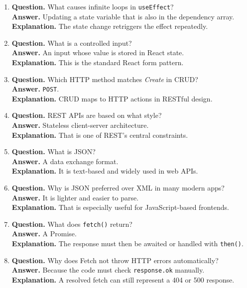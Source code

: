 \documentclass[11pt,a4paper]{article}
\begin{document}
\begin{enumerate}
  \item \textbf{Question.} What causes infinite loops in \texttt{useEffect}?\\
  \textbf{Answer.} Updating a state variable that is also in the dependency array.\\
  \textbf{Explanation.} The state change retriggers the effect repeatedly.

  \item \textbf{Question.} What is a controlled input?\\
  \textbf{Answer.} An input whose value is stored in React state.\\
  \textbf{Explanation.} This is the standard React form pattern.

  \item \textbf{Question.} Which HTTP method matches \emph{Create} in CRUD?\\
  \textbf{Answer.} \texttt{POST}.\\
  \textbf{Explanation.} CRUD maps to HTTP actions in RESTful design.

  \item \textbf{Question.} REST APIs are based on what style?\\
  \textbf{Answer.} Stateless client-server architecture.\\
  \textbf{Explanation.} That is one of REST's central constraints.

  \item \textbf{Question.} What is JSON?\\
  \textbf{Answer.} A data exchange format.\\
  \textbf{Explanation.} It is text-based and widely used in web APIs.

  \item \textbf{Question.} Why is JSON preferred over XML in many modern apps?\\
  \textbf{Answer.} It is lighter and easier to parse.\\
  \textbf{Explanation.} That is especially useful for JavaScript-based frontends.

  \item \textbf{Question.} What does \texttt{fetch()} return?\\
  \textbf{Answer.} A Promise.\\
  \textbf{Explanation.} The response must then be awaited or handled with \texttt{then()}.

  \item \textbf{Question.} Why does Fetch not throw HTTP errors automatically?\\
  \textbf{Answer.} Because the code must check \texttt{response.ok} manually.\\
  \textbf{Explanation.} A resolved fetch can still represent a 404 or 500 response.


\end{enumerate}
\end{document}
